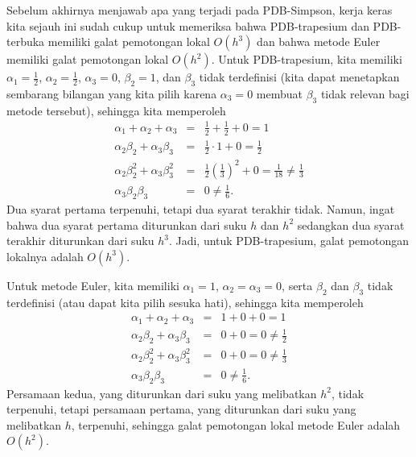 Sebelum akhirnya menjawab apa yang terjadi pada PDB-Simpson, kerja
keras kita sejauh ini sudah cukup untuk memeriksa bahwa PDB-trapesium
dan PDB-terbuka memiliki galat pemotongan lokal $O(h^{3})$ dan bahwa
metode Euler memiliki galat pemotongan lokal $O(h^{2})$. Untuk PDB-trapesium,
kita memiliki $\alpha_{1}=\frac{1}{2}$, $\alpha_{2}=\frac{1}{2}$,
$\alpha_{3}=0$, $\beta_{2}=1$, dan $\beta_{3}$ tidak terdefinisi
(kita dapat menetapkan sembarang bilangan yang kita pilih karena $\alpha_{3}=0$
membuat $\beta_{3}$ tidak relevan bagi metode tersebut), sehingga
kita memperoleh
\begin{eqnarray*}
\alpha_{1}+\alpha_{2}+\alpha_{3} & = & \frac{1}{2}+\frac{1}{2}+0=1\\
\alpha_{2}\beta_{2}+\alpha_{3}\beta_{3} & = & \frac{1}{2}\cdot1+0=\frac{1}{2}\\
\alpha_{2}\beta_{2}^{2}+\alpha_{3}\beta_{3}^{2} & = & \frac{1}{2}\left(\frac{1}{3}\right)^{2}+0=\frac{1}{18}\neq\frac{1}{3}\\
\alpha_{3}\beta_{2}\beta_{3} & = & 0\neq\frac{1}{6}.
\end{eqnarray*}
Dua syarat pertama terpenuhi, tetapi dua syarat terakhir tidak. Namun,
ingat bahwa dua syarat pertama diturunkan dari suku $h$ dan $h^{2}$
sedangkan dua syarat terakhir diturunkan dari suku $h^{3}$. Jadi,
untuk PDB-trapesium, galat pemotongan lokalnya adalah $O(h^{3})$.

Untuk metode Euler, kita memiliki $\alpha_{1}=1$, $\alpha_{2}=\alpha_{3}=0$,
serta $\beta_{2}$ dan $\beta_{3}$ tidak terdefinisi (atau dapat
kita pilih sesuka hati), sehingga kita memperoleh
\begin{eqnarray*}
\alpha_{1}+\alpha_{2}+\alpha_{3} & = & 1+0+0=1\\
\alpha_{2}\beta_{2}+\alpha_{3}\beta_{3} & = & 0+0=0\neq\frac{1}{2}\\
\alpha_{2}\beta_{2}^{2}+\alpha_{3}\beta_{3}^{2} & = & 0+0=0\neq\frac{1}{3}\\
\alpha_{3}\beta_{2}\beta_{3} & = & 0\neq\frac{1}{6}.
\end{eqnarray*}
Persamaan kedua, yang diturunkan dari suku yang melibatkan $h^{2}$,
tidak terpenuhi, tetapi persamaan pertama, yang diturunkan dari suku
yang melibatkan $h$, terpenuhi, sehingga galat pemotongan lokal metode
Euler adalah $O(h^{2})$.

